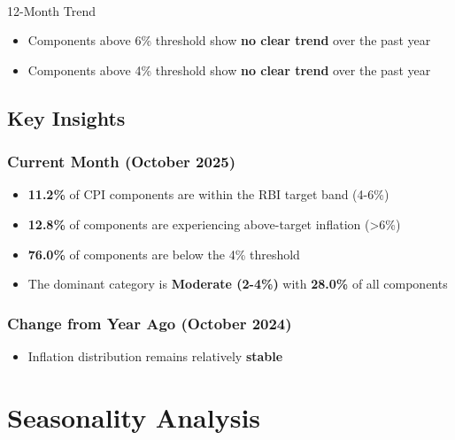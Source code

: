 \documentclass[
  letterpaper,
  DIV=11,
  numbers=noendperiod]{scrartcl}
\makeatletter
\let\oldparagraph\paragraph
\renewcommand{\paragraph}{
    \@ifstar
      \xxxParagraphStar
      \xxxParagraphNoStar
  }
\newcommand{\xxxParagraphStar}[1]{\oldparagraph*{#1}\mbox{}}
\newcommand{\xxxParagraphNoStar}[1]{\oldparagraph{#1}\mbox{}}
\providecommand{\tightlist}{%
  \setlength{\itemsep}{0pt}\setlength{\parskip}{0pt}}
\makeatother
\begin{document}
\paragraph{12-Month Trend}\label{month-trend}

\begin{itemize}
\item
  Components above 6\% threshold show \textbf{no clear trend} over the
  past year
\item
  Components above 4\% threshold show \textbf{no clear trend} over the
  past year
\end{itemize}

\subsection{Key Insights}\label{key-insights}

\subsubsection{Current Month (October
2025)}\label{current-month-october-2025-1}

\begin{itemize}
\item
  \textbf{11.2\%} of CPI components are within the RBI target band
  (4-6\%)
\item
  \textbf{12.8\%} of components are experiencing above-target inflation
  (\textgreater6\%)
\item
  \textbf{76.0\%} of components are below the 4\% threshold
\item
  The dominant category is \textbf{Moderate (2-4\%)} with
  \textbf{28.0\%} of all components
\end{itemize}

\subsubsection{Change from Year Ago (October
2024)}\label{change-from-year-ago-october-2024-1}

\begin{itemize}
\tightlist
\item
  Inflation distribution remains relatively \textbf{stable}
\end{itemize}

\section{Seasonality Analysis}\label{seasonality-analysis}
\end{document}
